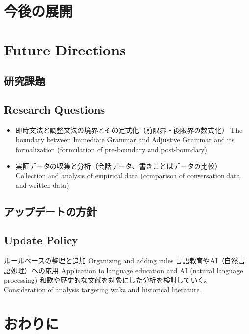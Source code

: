\documentclass[a4paper,xelatex,ja=standard]{bxjsarticle}
\begin{document}
\fi





\ifJPN
  \section{今後の展開}
\else
  \section{Future Directions}
\fi

\ifJPN
  \subsection{研究課題}
\else
  \subsection{Research Questions}
\fi

\begin{itemize}
  \item 
\ifJPN
即時文法と調整文法の境界とその定式化（前限界・後限界の数式化）
\else
The boundary between Immediate Grammar and Adjustive Grammar and its formalization (formulation of pre-boundary and post-boundary)
\fi

  \item 
\ifJPN
実証データの収集と分析（会話データ、書きことばデータの比較）
\else
Collection and analysis of empirical data (comparison of conversation data and written data)
\fi
\end{itemize}

\ifJPN
  \subsection{アップデートの方針}
\else
  \subsection{Update Policy}
\fi

\ifJPN
ルールベースの整理と追加
\else
Organizing and adding rules
\fi
\ifJPN
言語教育やAI（自然言語処理）への応用
\else
Application to language education and AI (natural language processing)
\fi
\ifJPN
和歌や歴史的な文献を対象にした分析を検討していく。
\else
Consideration of analysis targeting waka and historical literature.
\fi

\ifJPN
  \section{おわりに}
\else
\end{document}

